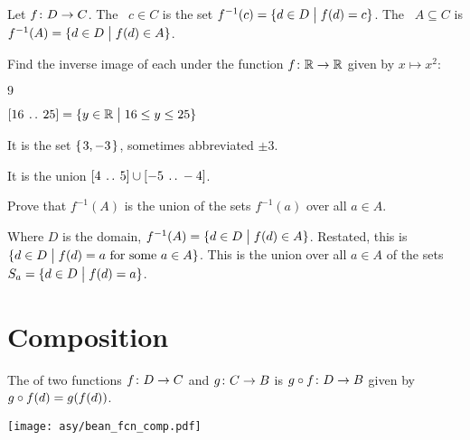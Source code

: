 \documentclass{ibl}  %
\begin{document}
\begin{df}
Let $\mbox{$f\colon D\to C$}$.
The ~$c\in C$ is
the set $f^{-1}(c)=\{d\in D \bigm| f(d)=c\}$.
The ~$A\subseteq C$
is $f^{-1}(A)=\{d\in D \bigm| f(d)\in A\}$.   
\end{df}

\begin{problem}
Find the inverse image of each under the function $\mbox{$f\colon \mathbb{R}\to \mathbb{R}$}$ 
given by $x\mapsto x^2$:
\begin{items}
\item $9$
\item $[16\:\mathinner{\ldotp\ldotp}\:25]=\{y\in\mathbb{R} \bigm| 16\leq y\leq 25\}$
\end{items}
\begin{answer}
\begin{items}
\item It is the set $\mbox{$\{\hspace{0.1em}3,-3\hspace{0.1em}\}$}$, sometimes abbreviated $\pm 3$.
\item It is the union $[4\:\mathinner{\ldotp\ldotp}\:5]\cup [-5\:\mathinner{\ldotp\ldotp}\:-4]$.    
\end{items}
\end{answer}
\end{problem}

\begin{problem}
Prove that $f^{-1}(A)$ is the union of the sets $f^{-1}(a)$ over all $a\in A$.
\begin{answer}
Where $D$ is the domain, 
$f^{-1}(A)=\{d\in D \bigm| f(d)\in A\}$.
Restated, this is $\{d\in D \bigm| \text{$f(d)=a$ for some $a\in A$}\}$.
This is the union over all $a\in A$ of the 
sets $S_a=\{d\in D \bigm| f(d)=a\}$.  
\end{answer}
\end{problem}





\section{Composition}

\begin{df}
The  of
two functions
$\mbox{$f\colon D\to C$}$ and $\mbox{$g\colon C\to B$}$ 
is $\mbox{$g\mathbin{\circ} f\colon D\to B$}$ given by 
$g\mathbin{\circ} f(d)=g(f(d))$.
\end{df}

\begin{center}
  \texttt{[image: asy/bean\_fcn\_comp.pdf]}  
\end{center}
\end{document}
